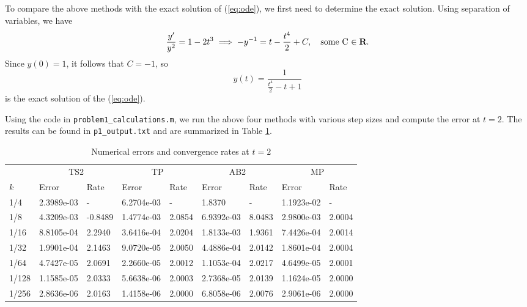 \documentclass{homework}
\begin{document}
\begin{alphaparts}
		\questionpart To compare the above methods with the exact solution of (\ref{eq:ode}), we first need to determine the exact solution. Using separation of variables, we have
		\begin{equation*}
			\frac{y'}{y^2} = 1-2t^3 \implies -y^{-1} = t - \frac{t^4}{2} + C, \quad \text{some C $\in \textnormal{\bf R}$}.
		\end{equation*}
		Since $y(0)=1$, it follows that $C = -1$, so
		\begin{equation*}
			y(t) = \frac{1}{\frac{t^4}{2} - t + 1}
		\end{equation*}
		is the exact solution of the (\ref{eq:ode}).
		
		Using the code in \verb*|problem1_calculations.m|, we run the above four methods with various step sizes and compute the error at $t = 2$. The results can be found in \verb*|p1_output.txt| and are summarized in Table \ref{table:errors}.
		\begin{table}
			\centering
			\begin{tabular}{@{}lllllllll@{}}
				\toprule
				& \multicolumn{2}{c}{TS2} & \multicolumn{2}{c}{TP} & \multicolumn{2}{c}{AB2} & \multicolumn{2}{c}{MP} \\
				\cmidrule(lr){2-3}
				\cmidrule(lr){4-5}
				\cmidrule(lr){6-7}
				\cmidrule(lr){8-9}
				$k$ & Error & Rate & Error & Rate & Error & Rate & Error & Rate \\
				\midrule
				1/4 & 2.3989e-03 & - & 6.2704e-03 & - & 1.8370 & - & 1.1923e-02 & - \\
				1/8 & 4.3209e-03 & -0.8489 & 1.4774e-03 & 2.0854 & 6.9392e-03 & 8.0483 & 2.9800e-03 & 2.0004 \\
				1/16 & 8.8105e-04 & 2.2940 & 3.6416e-04 & 2.0204 & 1.8133e-03 & 1.9361 & 7.4426e-04 & 2.0014 \\
				1/32 & 1.9901e-04 & 2.1463 & 9.0720e-05 & 2.0050 & 4.4886e-04 & 2.0142 & 1.8601e-04 & 2.0004 \\
				1/64 & 4.7427e-05 & 2.0691 & 2.2660e-05 & 2.0012 & 1.1053e-04 & 2.0217 & 4.6499e-05 & 2.0001 \\
				1/128 & 1.1585e-05 & 2.0333 & 5.6638e-06 & 2.0003 & 2.7368e-05 & 2.0139 & 1.1624e-05 & 2.0000 \\
				1/256 & 2.8636e-06 & 2.0163 & 1.4158e-06 & 2.0000 & 6.8058e-06 & 2.0076 & 2.9061e-06 & 2.0000 \\
				\bottomrule
			\end{tabular}
			\caption{Numerical errors and convergence rates at $t=2$}
			\label{table:errors}
		\end{table}
		

\end{alphaparts}
\end{document}
